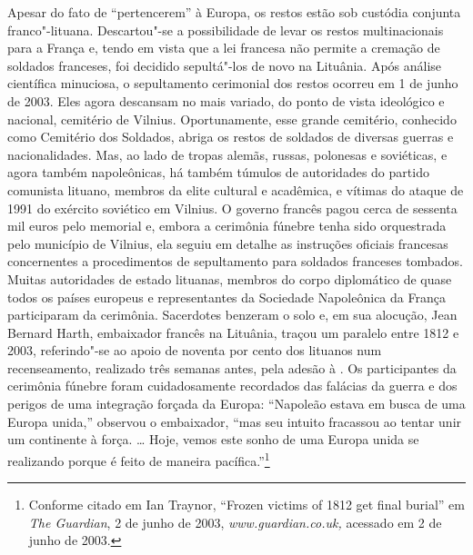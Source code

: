 Apesar do fato de ``pertencerem'' à Europa, os restos estão sob custódia
conjunta franco"-lituana. Descartou"-se a possibilidade de levar os restos
multinacionais para a França e, tendo em vista que a lei francesa não
permite a cremação de soldados franceses, foi decidido sepultá"-los de
novo na Lituânia. Após análise científica minuciosa, o sepultamento
cerimonial dos restos ocorreu em 1 de junho de 2003. Eles agora
descansam no mais variado, do ponto de vista ideológico e nacional,
cemitério de Vilnius. Oportunamente, esse grande cemitério, conhecido
como Cemitério dos Soldados, abriga os restos de soldados de diversas
guerras e nacionalidades. Mas, ao lado de tropas alemãs, russas,
polonesas e soviéticas, e agora também napoleônicas, há também túmulos
de autoridades do partido comunista lituano, membros da elite cultural e
acadêmica, e vítimas do ataque de 1991 do exército soviético em Vilnius.
O governo francês pagou cerca de sessenta mil euros pelo memorial e,
embora a cerimônia fúnebre tenha sido orquestrada pelo município de
Vilnius, ela seguiu em detalhe as instruções oficiais francesas
concernentes a procedimentos de sepultamento para soldados franceses
tombados. Muitas autoridades de estado lituanas, membros do corpo
diplomático de quase todos os países europeus e representantes da
Sociedade Napoleônica da França participaram da cerimônia. Sacerdotes
benzeram o solo e, em sua alocução, Jean Bernard Harth, embaixador
francês na Lituânia, traçou um paralelo entre 1812 e 2003, referindo"-se
ao apoio de noventa por cento dos lituanos num recenseamento, realizado
três semanas antes, pela adesão à . Os participantes da cerimônia
fúnebre foram cuidadosamente recordados das falácias da guerra e dos
perigos de uma integração forçada da Europa: ``Napoleão estava em busca
de uma Europa unida,'' observou o embaixador, ``mas seu intuito
fracassou ao tentar unir um continente à força. \ldots{} Hoje, vemos
este sonho de uma Europa unida se realizando porque é feito de maneira
pacífica.''\footnote{Conforme citado em Ian Traynor, ``Frozen victims of 1812 get final burial'' em \textit{The Guardian}, 2 de junho de 2003, \textit{www.guardian.co.uk,} acessado em 2 de junho de 2003.}

